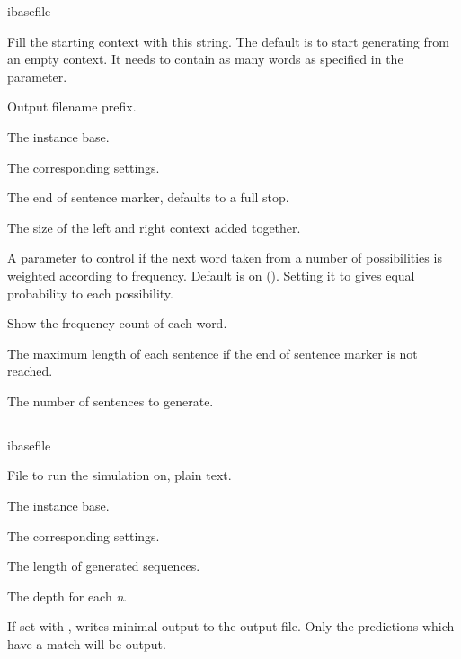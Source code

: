 \documentclass[a4paper,10pt,twoside]{report}
\begin{document}
\begin{varlist}{ibasefile}
\item[start] Fill the starting context with this string. The default
  is to start generating from an empty context. It needs to contain as
  many words as specified in the  parameter.
\item[filename] Output filename prefix.
\item[ibasefile] The instance base.
\item[timbl] The corresponding \Timbl{} settings.
\item[end] The end of sentence marker, defaults to a full stop.
\item[ws] The size of the left and right context added together.
\item[mode] A parameter to control if the next word taken from a
  number of possibilities is weighted according to frequency. Default
  is on (). Setting it to  gives equal probability to
  each possibility.
\item[sc] Show the frequency count of each word.
\item[len] The maximum length of each sentence if the end of sentence
  marker is not reached.
\item[n] The number of sentences to generate.
\end{varlist}

\subsection{}

\begin{varlist}{ibasefile}
\item[filename] File to run the simulation on, plain text.
\item[ibasefile] The instance base.
\item[timbl] The corresponding \Timbl{} settings.
\item[n] The length of generated sequences.
\item[ds] The depth for each \emph{n}.
\item[mo] If set with , writes minimal output to the output file. Only
  the predictions which have a match will be output.
\end{varlist}

\subsection{}
\end{document}
